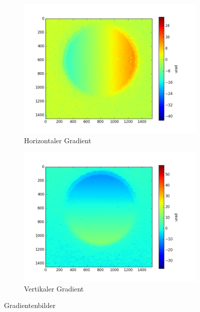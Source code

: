 \begin{figure}[htbp]
	\centering
	\begin{subfigure}[b]{0.35\textwidth}
		\centering
		\includegraphics[width=\textwidth]{img/SpeckDisH_E10001_edf_ref_start0001_1-10_edf}
		\caption[Horizontaler Gradient]{Horizontaler Gradient}
		\label{fig:hor_grad}
	\end{subfigure}
	\begin{subfigure}[b]{0.35\textwidth}
		\centering
		\includegraphics[width=\textwidth]{img/SpeckDisV_E10001_edf_ref_start0001_1-10_edf}
		\caption[Vertikaler Gradient]{Vertikaler Gradient}
		\label{fig:vert_grad}
	\end{subfigure}
	\caption[Gradient]{Gradientenbilder}
	\label{fig:gradienten}
\end{figure}


